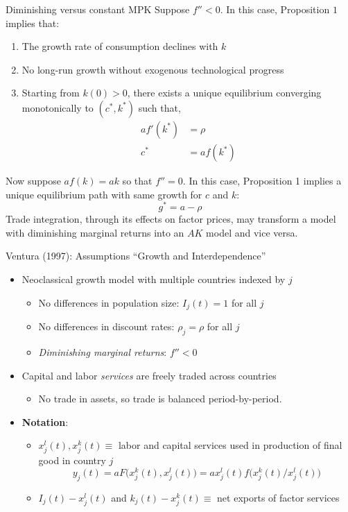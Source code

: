 \documentclass[10pt,notes=hide]{beamer}
\begin{document}
\begin{frame}{Diminishing versus constant MPK}
Suppose $f''<0$. In this case, Proposition $1$ implies that:
\begin{enumerate}
\item The growth rate of consumption declines with $k$
\item No long-run growth without exogenous technological progress
\item Starting from $k(0)>0$, there exists a unique equilibrium converging monotonically to $(c^*,k^*)$ such that,
	\begin{align*}
	a f' ( k^* ) &= \rho \\ 
	c^* &= a f(k^*)
	\end{align*}
\end{enumerate}
\pause
Now suppose $af(k)=ak$ so that $f'' = 0$.
In this case, Proposition 1 implies a unique equilibrium path with same growth for $c$ and $k$:
\[
g^* = a - \rho
\]
\pause
Trade integration, through its effects on factor prices, may transform a model with diminishing marginal returns into an $AK$ model and vice versa.
\end{frame}
\begin{frame}{Ventura (1997): Assumptions}
{\small ``Growth and Interdependence''}
\begin{itemize}
\item Neoclassical growth model with multiple countries indexed by $j$
	\begin{itemize}
	\item No differences in population size: $I_j(t) = 1$ for all $j$
	\item No differences in discount rates: $\rho_j = \rho$ for all $j$
	\item \emph{Diminishing marginal returns}: $f''<0$
	\end{itemize}
\item Capital and labor \emph{services} are freely traded across countries
	\begin{itemize}
	\item No trade in assets, so trade is balanced period-by-period.
	\end{itemize}
\item {\bf Notation}:
	\begin{itemize}
	\item $x^l_j(t), x^k_j(t) \equiv $ labor and capital services used in production of final good in country $j$
	\[
	y_j(t) = a F\big( x^k_j(t), x^l_j(t) \big) = a x_j^l(t) f\big( x^k_j(t) / x^l_j(t) \big)
	\]
	\item $I_j(t) - x_j^l(t)$ and $k_j(t) - x^k_j(t) \equiv$ net exports of factor services
	\end{itemize}
\end{itemize}
\end{frame}
\end{document}
